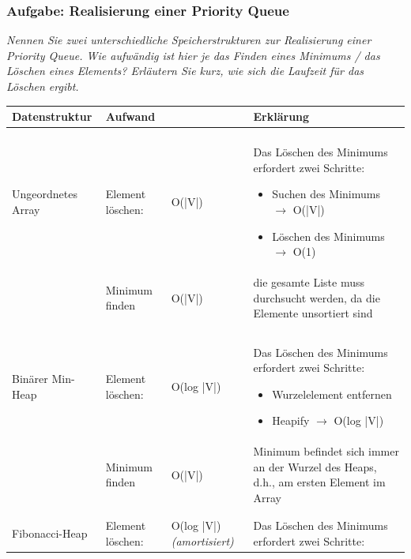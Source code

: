\documentclass{article}
\begin{document}
\subsubsection{Aufgabe: Realisierung einer Priority Queue \textcolor{ForestGreen}{\CheckmarkBold}} 
\textit{Nennen Sie zwei unterschiedliche Speicherstrukturen zur Realisierung einer Priority Queue. Wie aufwändig ist hier je das Finden eines Minimums / das Löschen eines Elements? Erläutern Sie kurz, wie sich die Laufzeit für das Löschen ergibt.} \cite{probeklausur21} \cite{probeklausur24}
\begin{table}[H]
    \centering
    \begin{tabular}{p{3.5cm} p{3cm} p{1.5cm} p{6cm}}
        \textbf{Datenstruktur} & \textbf{Aufwand}  & & \textbf{Erklärung}   \\ \hline \\
        Ungeordnetes Array\index{Array, ungeordnet} & Element löschen: & O(|V|)  & Das Löschen des Minimums erfordert zwei Schritte: 
        \begin{itemize}
            \item Suchen des Minimums $\rightarrow$ O(|V|)
            \item Löschen des Minimums $\rightarrow$ O(1)
        \end{itemize}
        \\ 
        & Minimum finden & O(|V|) & die gesamte Liste muss durchsucht werden, da die Elemente unsortiert sind \\ \\  \\
        Binärer Min-Heap\index{Heap!Min-} \index{Heap!binärer} & Element löschen: & O(log |V|)  & Das Löschen des Minimums erfordert zwei Schritte: 
        \begin{itemize}
            \item Wurzelelement entfernen 
            \item Heapify $\rightarrow$ O(log |V|)
        \end{itemize}
        \\ 
         & Minimum finden & O(|V|) & Minimum befindet sich immer an der Wurzel des Heaps\index{Heap}, d.h., am ersten Element im Array\\ \\  \\
         Fibonacci-Heap\index{Heap!Fibonacci} & Element löschen: & O(log |V|) \tiny\textit{(amortisiert)}   &    Das Löschen des Minimums erfordert zwei Schritte:    

\end{tabular}
\end{table}
\end{document}
